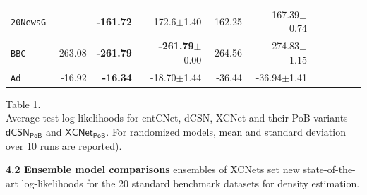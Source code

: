 \documentclass[final]{beamer}
\begin{document}
\begin{frame}{}
\begin{textblock}{17.5}
\begin{minipage}{0.7\linewidth}
\begin{table}[t]
\begin{tabular}{l rrrrrrrrrr}
    \texttt{20NewsG} & - &\textbf{-161.72}&-172.6$\pm$1.40&-162.25&-167.39$\pm$0.74\\
    \texttt{BBC}          &-263.08&\textbf{-261.79}&\textbf{-261.79}$\pm$0.00&-264.56&-274.83$\pm$1.15\\
    \texttt{Ad}           &-16.92&\textbf{-16.34}&-18.70$\pm$1.44&-36.44&-36.94$\pm$1.41\\
    \bottomrule
  \end{tabular}
  \label{tab:ll-sing}
\end{table}
\end{minipage}
\begin{minipage}{0.28\linewidth}
  \scriptsize
  \flushleft
  \vspace{-110pt}
  Table 1.\\
  Average test log-likelihoods for 
  \textsf{entCNet}, \textsf{dCSN}, \textsf{XCNet} and their
  \textsf{PoB} variants $\mathsf{dCSN_{PoB}}$ and $\mathsf{XCNet_{PoB}}$.
    For randomized models, mean and standard deviation over 10 runs are reported).
\end{minipage}

\vspace{10pt}
{\bf 4.2 Ensemble model comparisons}
\small ensembles of XCNets set new state-of-the-art log-likelihoods
for the 20 standard benchmark datasets for density estimation.
\vspace{-10pt}
\begin{table}[t]


\end{table}
\end{textblock}
\end{frame}
\end{document}
